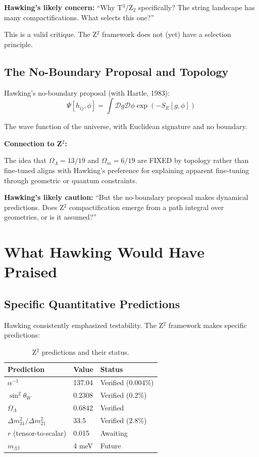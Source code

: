 \documentclass[12pt,a4paper]{article}
\begin{document}
\textbf{Hawking's likely concern:} ``Why T$^3$/Z$_2$ specifically? The string landscape has many compactifications. What selects this one?''

This is a valid critique. The Z$^2$ framework does not (yet) have a selection principle.

\subsection{The No-Boundary Proposal and Topology}

Hawking's no-boundary proposal (with Hartle, 1983):
\begin{equation}
\Psi[h_{ij}, \phi] = \int \mathcal{D}g \mathcal{D}\phi \exp(-S_E[g, \phi])
\end{equation}

The wave function of the universe, with Euclidean signature and no boundary.

\textbf{Connection to Z$^2$:}

The idea that $\Omega_\Lambda = 13/19$ and $\Omega_m = 6/19$ are FIXED by topology rather than fine-tuned aligns with Hawking's preference for explaining apparent fine-tuning through geometric or quantum constraints.

\textbf{Hawking's likely caution:} ``But the no-boundary proposal makes dynamical predictions. Does Z$^2$ compactification emerge from a path integral over geometries, or is it assumed?''

\section{What Hawking Would Have Praised}

\subsection{Specific Quantitative Predictions}

Hawking consistently emphasized testability. The Z$^2$ framework makes specific predictions:

\begin{table}[h]
\centering
\begin{tabular}{@{}lll@{}}
\toprule
Prediction & Value & Status \\
\midrule
$\alpha^{-1}$ & 137.04 & Verified (0.004\%) \\
$\sin^2\theta_W$ & 0.2308 & Verified (0.2\%) \\
$\Omega_\Lambda$ & 0.6842 & Verified \\
$\Delta m^2_{31}/\Delta m^2_{21}$ & 33.5 & Verified (2.8\%) \\
$r$ (tensor-to-scalar) & 0.015 & Awaiting \\
$m_{\beta\beta}$ & 4 meV & Future \\
\bottomrule
\end{tabular}
\caption{Z$^2$ predictions and their status.}
\end{table}
\end{document}
